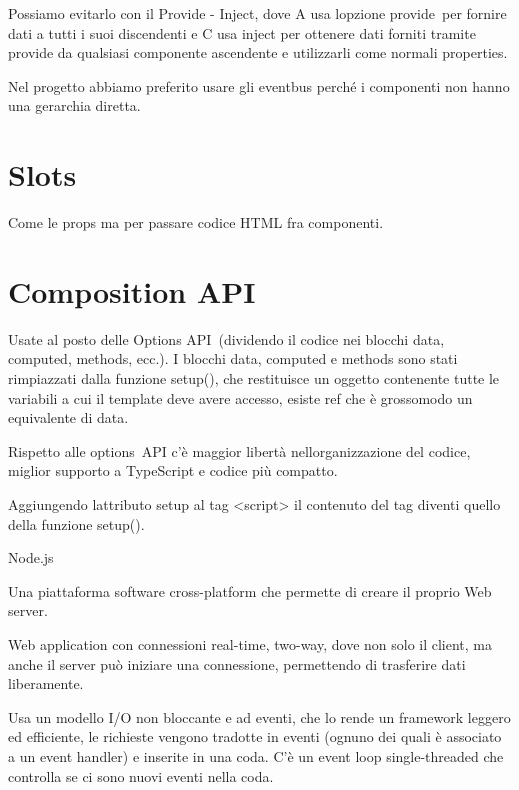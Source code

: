 \documentclass[
]{article}
\begin{document}
{Possiamo evitarlo con il }{Provide - Inject}{, dove A usa
l\textquotesingle opzione }{provide}{~}{per fornire dati a tutti i suoi
discendenti e C usa }{inject }{per ottenere dati forniti tramite provide
da qualsiasi componente ascendente e utilizzarli come normali
properties.}

{}

{Nel progetto abbiamo preferito usare gli eventbus perché i componenti
non hanno una gerarchia diretta.}

\section{\texorpdfstring{{Slots}}{Slots}}\label{h.gml9z0xfadm1}

{Come le props ma per passare codice HTML fra componenti.}

\section{\texorpdfstring{{Composition
API}}{Composition API}}\label{h.xau8iclcatpq}

{Usate al posto delle }{Options API}{~(dividendo il codice nei blocchi
data, computed, methods, ecc.). I blocchi data, computed e methods sono
stati rimpiazzati dalla funzione setup(), che restituisce un oggetto
contenente tutte le variabili a cui il template deve avere accesso,
esiste ref che è grossomodo un equivalente di data.}

{}

{Rispetto alle }{options}{~API c'è maggior libertà
nell\textquotesingle organizzazione del codice, miglior supporto a
TypeScript e codice più compatto.}

{}

{Aggiungendo l\textquotesingle attributo setup al tag
\textless script\textgreater{} il contenuto del tag diventi quello della
funzione setup().}

{}

{}

{Node.js}

{Una piattaforma software cross-platform che permette di creare il
proprio Web server.}

{}

{Web application con connessioni real-time, two-way, dove non solo il
client, ma anche il server può iniziare una connessione, permettendo di
trasferire dati liberamente.}

{Usa un modello I/O non bloccante e ad eventi, che lo rende un framework
leggero ed efficiente, le richieste vengono tradotte in eventi (ognuno
dei quali è associato a un event handler) e inserite in una coda. C'è un
event loop single-threaded che controlla se ci sono nuovi eventi nella
coda.}
\end{document}
